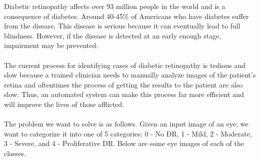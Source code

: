 \documentclass{article} %
\begin{document}
Diabetic retinopathy affects over 93 million people in the world and is a consequence of diabetes. Around 40-45\% of Americans who have diabetes suffer from the disease. This disease is serious because it can eventually lead to full blindness. However, if the disease is detected at an early enough stage, impairment may be prevented. \\ \\
The current process for identifying cases of diabetic retinopathy is tedious and slow because a trained clinician needs to manually analyze images of the patient's retina and oftentimes the process of getting the results to the patient are also slow. Thus, an automated system can make this process far more efficient and will improve the lives of those afflicted. \\ \\
The problem we want to solve is as follows. Given an input image of an eye, we want to categorize it into one of 5 categories: 0 - No DR, 1 - Mild, 2 - Moderate, 3 - Severe, and 4 - Proliferative DR. Below are some eye images of each of the classes.
\begin{figure}[H]
	\centering
\end{figure}  
\end{document}
